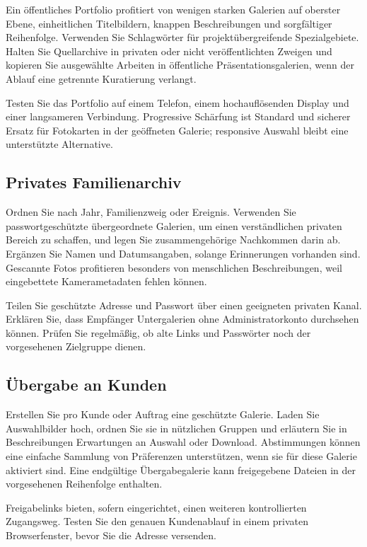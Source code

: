 \documentclass[11pt,a4paper]{article}
\begin{document}
Ein öffentliches Portfolio profitiert von wenigen starken Galerien auf oberster
Ebene, einheitlichen Titelbildern, knappen Beschreibungen und sorgfältiger
Reihenfolge. Verwenden Sie Schlagwörter für projektübergreifende Spezialgebiete.
Halten Sie Quellarchive in privaten oder nicht veröffentlichten Zweigen und
kopieren Sie ausgewählte Arbeiten in öffentliche Präsentationsgalerien, wenn der
Ablauf eine getrennte Kuratierung verlangt.

Testen Sie das Portfolio auf einem Telefon, einem hochauflösenden Display und
einer langsameren Verbindung. Progressive Schärfung ist Standard und sicherer
Ersatz für Fotokarten in der geöffneten Galerie; responsive Auswahl bleibt eine
unterstützte Alternative.

\subsection{Privates Familienarchiv}

Ordnen Sie nach Jahr, Familienzweig oder Ereignis. Verwenden Sie
passwortgeschützte übergeordnete Galerien, um einen verständlichen privaten
Bereich zu schaffen, und legen Sie zusammengehörige Nachkommen darin ab.
Ergänzen Sie Namen und Datumsangaben, solange Erinnerungen vorhanden sind.
Gescannte Fotos profitieren besonders von menschlichen Beschreibungen, weil
eingebettete Kamerametadaten fehlen können.

Teilen Sie geschützte Adresse und Passwort über einen geeigneten privaten Kanal.
Erklären Sie, dass Empfänger Untergalerien ohne Administratorkonto durchsehen
können. Prüfen Sie regelmäßig, ob alte Links und Passwörter noch der
vorgesehenen Zielgruppe dienen.

\subsection{Übergabe an Kunden}

Erstellen Sie pro Kunde oder Auftrag eine geschützte Galerie. Laden Sie
Auswahlbilder hoch, ordnen Sie sie in nützlichen Gruppen und erläutern Sie in
Beschreibungen Erwartungen an Auswahl oder Download. Abstimmungen können eine
einfache Sammlung von Präferenzen unterstützen, wenn sie für diese Galerie
aktiviert sind. Eine endgültige Übergabegalerie kann freigegebene Dateien in der
vorgesehenen Reihenfolge enthalten.

Freigabelinks bieten, sofern eingerichtet, einen weiteren kontrollierten
Zugangsweg. Testen Sie den genauen Kundenablauf in einem privaten
Browserfenster, bevor Sie die Adresse versenden.
\end{document}
